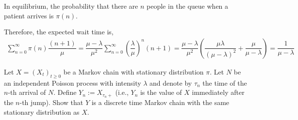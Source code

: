 \begin{solution}[Solution]
In equilibrium, the probability that there are \( n \) people in the queue when a patient arrives is \( \pi(n) \). 

Therefore, the expected wait time is,
\begin{align*}
    \sum_{n=0}^{\infty} \pi(n) \dfrac{(n+1)}{\mu} 
    = \dfrac{\mu-\lambda}{\mu^2}\sum_{n=0}^{\infty} \left( \dfrac{\lambda}{\mu} \right)^n (n+1) 
    = \dfrac{\mu-\lambda}{\mu^2} \left( \dfrac{\mu\lambda}{(\mu-\lambda)^2}+\dfrac{\mu}{\mu-\lambda} \right)
    = \dfrac{1}{\mu-\lambda}
\end{align*}
\end{solution}

\pagebreak
\begin{problem}[Exercise 5.2]
    Let \( X = (X_t)_{t\geq 0} \) be a Markov chain with stationary distribution \( \pi \). Let \( N \) be an independent Poisson process with intensity \( \lambda \) and denote by \( \tau_n \) the time of the \( n \)-th arrival of \( N \). Define \( Y_n:=X_{\tau_n+} \) (i.e., \( Y_n \) is the value of \( X \) immediately after the \( n \)-th jump). Show that \( Y \) is a discrete time Markov chain with the same stationary distribution as \( X \).
\end{problem}

